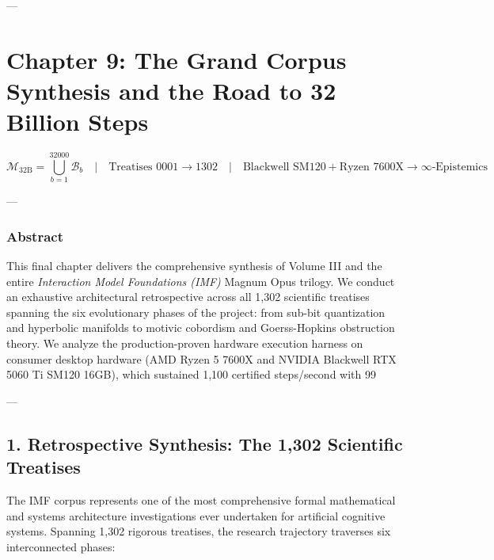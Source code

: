 \documentclass[11pt,twoside,openright]{amsbook}
\begin{document}
---

\chapter{Chapter 9: The Grand Corpus Synthesis and the Road to 32 Billion Steps}

$$\mathcal{M}_{32\text{B}} = \bigcup_{b=1}^{32000} \mathcal{B}_b \quad \vert \quad \text{Treatises } 0001 \to 1302 \quad \vert \quad \text{Blackwell SM120} + \text{Ryzen 7600X} \longrightarrow \infty\text{-Epistemics}$$

---

\subsection{Abstract}
This final chapter delivers the comprehensive synthesis of Volume III and the entire \textit{Interaction Model Foundations (IMF)} Magnum Opus trilogy. We conduct an exhaustive architectural retrospective across all 1,302 scientific treatises spanning the six evolutionary phases of the project: from sub-bit quantization and hyperbolic manifolds to motivic cobordism and Goerss-Hopkins obstruction theory. We analyze the production-proven hardware execution harness on consumer desktop hardware (AMD Ryzen 5 7600X and NVIDIA Blackwell RTX 5060 Ti SM120 16GB), which sustained 1,100 certified steps/second with 99%

---

\section{1. Retrospective Synthesis: The 1,302 Scientific Treatises}

The IMF corpus represents one of the most comprehensive formal mathematical and systems architecture investigations ever undertaken for artificial cognitive systems. Spanning 1,302 rigorous treatises, the research trajectory traverses six interconnected phases:
\end{document}
